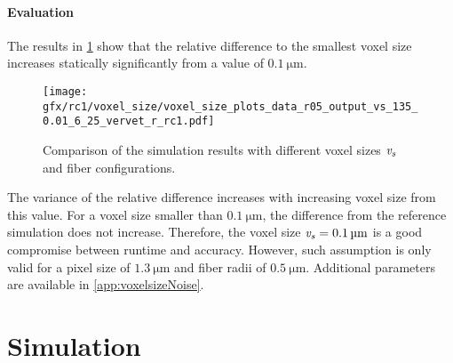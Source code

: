 \paragraph{Evaluation}
%
The results in \cref{fig:voxelsizeNoise} show that the relative difference to the smallest voxel size increases statically significantly from a value of $\SI{0.1}{\micro\meter}$.
%
\begin{figure}[!t]
    \centering
    \texttt{[image: gfx/rc1/voxel\_size/voxel\_size\_plots\_data\_r05\_output\_vs\_135\_0.01\_6\_25\_vervet\_r\_rc1.pdf]}
    \caption[]{Comparison of the simulation results with different voxel sizes $\textnormal{$\mathit{v_{s}}$}$ and fiber configurations.}
    \label{fig:voxelsizeNoise}
\end{figure}
%
The variance of the relative difference increases with increasing voxel size from this value.
For a voxel size smaller than $\SI{0.1}{\micro\meter}$, the difference from the reference simulation does not increase.
Therefore, the voxel size $\textnormal{$\mathit{v_{s}}$} = \SI{0.1}{\micro\meter}$ is a good compromise between runtime and accuracy.
However, such assumption is only valid for a pixel size of $\SI{1.3}{\micro\meter}$ and fiber radii of $\SI{0.5}{\micro\meter}$.
Additional parameters are available in \cref{app:voxelsizeNoise}.
%
%
%
\section{Simulation}
%
